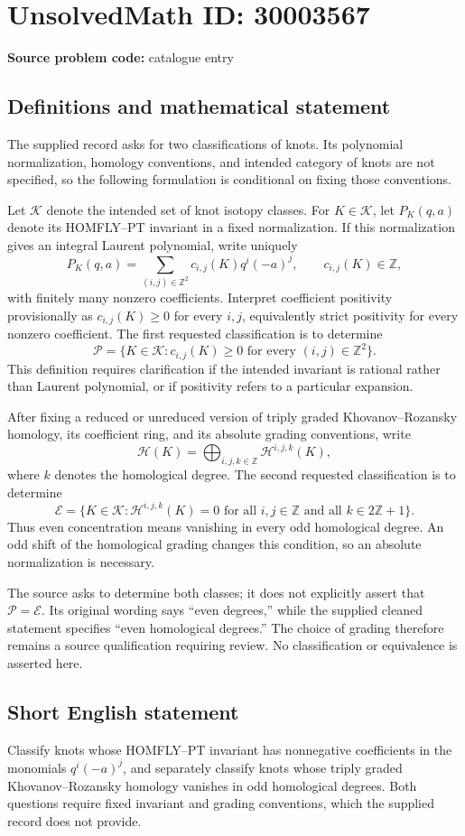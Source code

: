 \documentclass[11pt]{article}
\newcommand{\Z}{\mathbb{Z}}
\begin{document}
\section*{UnsolvedMath ID: 30003567}
\textbf{Source problem code:} catalogue entry
\subsection{Definitions and mathematical statement}
The supplied record asks for two classifications of knots. Its polynomial normalization, homology conventions, and intended category of knots are not specified, so the following formulation is conditional on fixing those conventions.

Let \(\mathcal K\) denote the intended set of knot isotopy classes. For \(K\in\mathcal K\), let \(P_K(q,a)\) denote its HOMFLY--PT invariant in a fixed normalization. If this normalization gives an integral Laurent polynomial, write uniquely
\[
P_K(q,a)=\sum_{(i,j)\in\Z^2}c_{i,j}(K)q^i(-a)^j,
\qquad c_{i,j}(K)\in\Z,
\]
with finitely many nonzero coefficients. Interpret coefficient positivity provisionally as \(c_{i,j}(K)\geq 0\) for every \(i,j\), equivalently strict positivity for every nonzero coefficient. The first requested classification is to determine
\[
\mathcal P=\{K\in\mathcal K: c_{i,j}(K)\geq 0\text{ for every }(i,j)\in\Z^2\}.
\]
This definition requires clarification if the intended invariant is rational rather than Laurent polynomial, or if positivity refers to a particular expansion.

After fixing a reduced or unreduced version of triply graded Khovanov--Rozansky homology, its coefficient ring, and its absolute grading conventions, write
\[
\mathcal H(K)=\bigoplus_{i,j,k\in\Z}\mathcal H^{i,j,k}(K),
\]
where \(k\) denotes the homological degree. The second requested classification is to determine
\[
\mathcal E=\{K\in\mathcal K:\mathcal H^{i,j,k}(K)=0
\text{ for all }i,j\in\Z\text{ and all }k\in 2\Z+1\}.
\]
Thus even concentration means vanishing in every odd homological degree. An odd shift of the homological grading changes this condition, so an absolute normalization is necessary.

The source asks to determine both classes; it does not explicitly assert that \(\mathcal P=\mathcal E\). Its original wording says ``even degrees,'' while the supplied cleaned statement specifies ``even homological degrees.'' The choice of grading therefore remains a source qualification requiring review. No classification or equivalence is asserted here.
\subsection{Short English statement}
Classify knots whose HOMFLY--PT invariant has nonnegative coefficients in the monomials \(q^i(-a)^j\), and separately classify knots whose triply graded Khovanov--Rozansky homology vanishes in odd homological degrees. Both questions require fixed invariant and grading conventions, which the supplied record does not provide.
\end{document}
